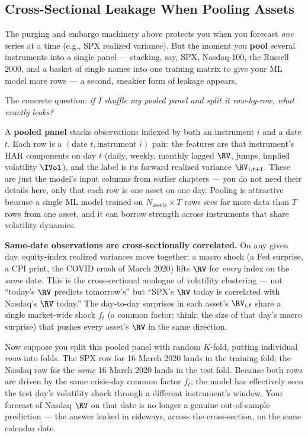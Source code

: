 \subsection{Cross-Sectional Leakage When Pooling Assets}
\label{sec:ch16:xsection-leakage}

The purging and embargo machinery above protects you when you forecast \emph{one} series at a time (e.g., SPX realized variance).
But the moment you \textbf{pool} several instruments into a single panel --- stacking, say, SPX, Nasdaq-100, the Russell 2000, and a basket of single names into one training matrix to give your ML model more rows --- a second, sneakier form of leakage appears.

The concrete question: \emph{if I shuffle my pooled panel and split it row-by-row, what exactly leaks?}

\begin{prereq}
A \textbf{pooled panel} stacks observations indexed by both an instrument $i$ and a date $t$.
Each row is a $(\text{date } t, \text{instrument } i)$ pair: the features are that instrument's HAR components on day $t$ (daily, weekly, monthly lagged $\RV$, jumps, implied volatility $\IVol$), and the label is its forward realized variance $\RV_{i,t+1}$.
These are just the model's input columns from earlier chapters --- you do not need their details here, only that each row is one asset on one day.
Pooling is attractive because a single ML model trained on $N_{\text{assets}} \times T$ rows sees far more data than $T$ rows from one asset, and it can borrow strength across instruments that share volatility dynamics.
\end{prereq}

\textbf{Same-date observations are cross-sectionally correlated.}
On any given day, equity-index realized variances move together: a macro shock (a Fed surprise, a CPI print, the COVID crash of March 2020) lifts $\RV$ for \emph{every} index on the \emph{same} date.
This is the cross-sectional analogue of volatility clustering --- not ``today's $\RV$ predicts tomorrow's'' but ``SPX's $\RV$ today is correlated with Nasdaq's $\RV$ today.''
The day-to-day surprises in each asset's $\RV_{i,t}$ share a single market-wide shock $f_t$ (a common factor; think: the size of that day's macro surprise) that pushes every asset's $\RV$ in the same direction.

Now suppose you split this pooled panel with random $K$-fold, putting individual \emph{rows} into folds. The SPX row for 16 March 2020 lands in the training fold; the Nasdaq row for the \emph{same} 16 March 2020 lands in the test fold. Because both rows are driven by the same crisis-day common factor $f_t$, the model has effectively seen the test day's volatility shock through a different instrument's window. Your forecast of Nasdaq $\RV$ on that date is no longer a genuine out-of-sample prediction --- the answer leaked in sideways, across the cross-section, on the same calendar date.

